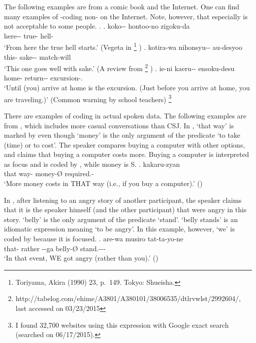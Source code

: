 The following examples are from a comic book and the Internet.
One can find many examples of -coding non- on the Internet.
Note, however, that
especially \Next[b] is not acceptable to some people.
%
\ex.
 \ag. koko-- hontoo-no zigoku-da \\
      here-- true- hell- \\
      `From here the true hell starts.'
      \hfill{(Vegeta in %
      \footnote{
      Toriyama, Akira (1990)  23, p.~149. Tokyo: Shueisha.
      }
      )}
 \bg. kotira-wa nihonsyu-- au-desyoo \\
      this- sake-- match-will \\
      `This one goes well with sake.'
      \hfill{(A review from %
       \footnote{http://tabelog.com/ehime/A3801/A380101/38006535/dtlrvwlst/2992604/, last accessed on 03/23/2015}
      )}
  \bg. ie-ni kaeru-- ensoku-desu \\
       home- return-- excursion-. \\
       `Until (you) arrive at home is the excursion. (Just before you arrive at home, you are traveling.)'
       \hfill{(Common warning by school teachers)}%
       \footnote{
       I found 32,700 websites using this expression with Google exact search (searched on 06/17/2015).
       }


There are examples of  coding 
in actual spoken data.
The following examples are from  \cite{Den_2007_SAC},
which includes more casual conversations than CSJ.
In \Next,
 `that way' is marked by  even though  `money' is the only argument of the  predicate  `to take (time) or to cost'.
The speaker compares buying a computer with other options,
and claims that buying a computer costs more.
Buying a computer is interpreted as focus and is coded by ,
while money is S.
%
\exg.    kakaru-zyan \\
	that way- money-{\O} required.- \\
	`More money costs in THAT way (i.e., if you buy a computer).' \hfill{()}

In \Next,
after listening to an angry story of another participant,
the speaker claims that it is the speaker himself (and the other participant) that were angry in this story.
 `belly' is the only argument of the  predicate  `stand'.
 `belly stands' is an idiomatic expression meaning `to be angry'.
In this example,
however,
 `we' is coded by 
because it is focused.
\exg. are-wa musiro   tat-ta-yo-ne \\
	that- rather --ga belly-{\O} stand.--- \\
	`In that event, WE got angry (rather than you).' \hfill{()}

